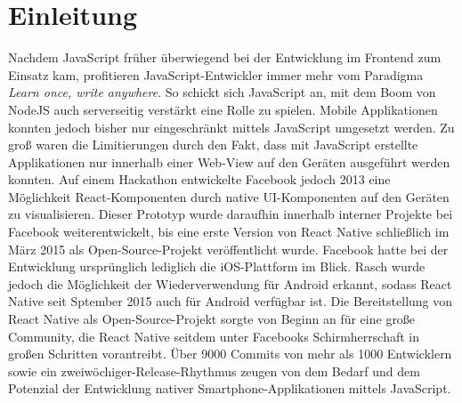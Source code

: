 \section{Einleitung}
Nachdem JavaScript früher überwiegend bei der Entwicklung im Frontend zum Einsatz kam, profitieren JavaScript-Entwickler immer mehr vom Paradigma \textit{Learn once, write anywhere}. So schickt sich JavaScript an, mit dem Boom von NodeJS auch serverseitig verstärkt eine Rolle zu spielen. Mobile Applikationen konnten jedoch bisher nur eingeschränkt mittels JavaScript umgesetzt werden. Zu groß waren die Limitierungen durch den Fakt, dass mit JavaScript erstellte Applikationen nur innerhalb einer Web-View auf den Geräten ausgeführt werden konnten. Auf einem Hackathon entwickelte Facebook jedoch 2013 eine Möglichkeit React-Komponenten durch native UI-Komponenten auf den Geräten zu visualisieren. Dieser Prototyp wurde daraufhin innerhalb interner Projekte bei Facebook weiterentwickelt, bis eine erste Version von React Native schließlich im März 2015 als Open-Source-Projekt veröffentlicht wurde. Facebook hatte bei der Entwicklung ursprünglich lediglich die iOS-Plattform im Blick. Rasch wurde jedoch die Möglichkeit der Wiederverwendung für Android erkannt, sodass React Native seit Sptember 2015 auch für Android verfügbar ist.
Die Bereitstellung von React Native als Open-Source-Projekt sorgte von Beginn an für eine große Community, die React Native seitdem unter Facebooks Schirmherrschaft in großen Schritten vorantreibt. Über 9000 Commits von mehr als 1000 Entwicklern sowie ein zweiwöchiger-Release-Rhythmus zeugen von dem Bedarf und dem Potenzial der  Entwicklung nativer Smartphone-Applikationen mittels JavaScript.